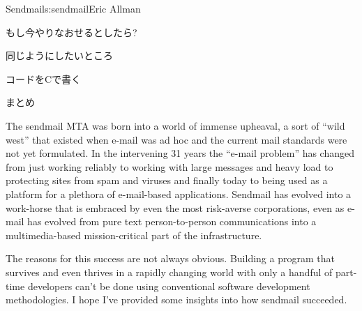 \begin{aosachapter}{Sendmail}{s:sendmail}{Eric Allman}
\begin{aosasect1}{もし今やりなおせるとしたら?}
\begin{aosasect2}{同じようにしたいところ}
\begin{aosasect3}{コードをCで書く}
\end{aosasect3}

\end{aosasect2}

\end{aosasect1}

\begin{aosasect1}{まとめ}

The sendmail MTA was born into a world of immense upheaval, a sort of
``wild west'' that existed when e-mail was ad hoc and the current mail
standards were not yet formulated.  In the intervening 31 years the
``e-mail problem'' has changed from just working reliably to working
with large messages and heavy load to protecting sites from spam and
viruses and finally today to being used as a platform for a plethora
of e-mail-based applications.  Sendmail has evolved into a work-horse
that is embraced by even the most risk-averse corporations, even as
e-mail has evolved from pure text person-to-person communications into
a multimedia-based mission-critical part of the infrastructure.

The reasons for this success are not always obvious.  Building a
program that survives and even thrives in a rapidly changing world
with only a handful of part-time developers can't be done using
conventional software development methodologies.  I hope I've provided
some insights into how sendmail succeeded.

\end{aosasect1}

\end{aosachapter}
